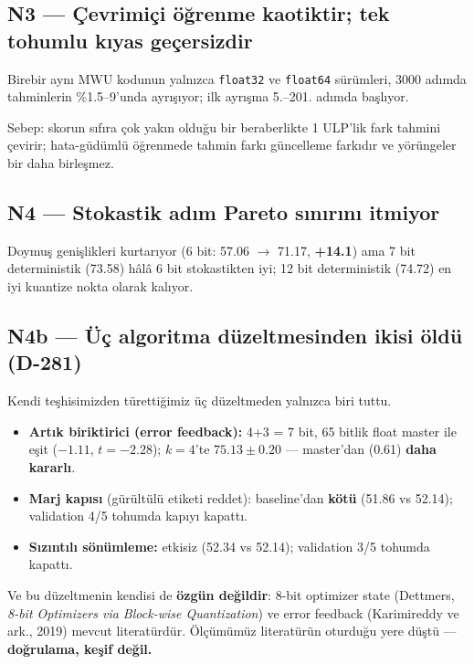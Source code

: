 \documentclass[11pt]{article}
\newenvironment{notkutu}{\def\FrameCommand{\fboxsep=6pt\colorbox{kutu}}\MakeFramed{\advance\hsize-\width\FrameRestore}\small}{\endMakeFramed}
\begin{document}
\subsection*{N3 — Çevrimiçi öğrenme kaotiktir; tek tohumlu kıyas geçersizdir}
Birebir aynı MWU kodunun yalnızca \texttt{float32} ve \texttt{float64} sürümleri, 3000 adımda tahminlerin \%1.5–9'unda ayrışıyor; ilk ayrışma 5.–201. adımda başlıyor.
\begin{center}\small{}\end{center}
Sebep: skorun sıfıra çok yakın olduğu bir beraberlikte 1 ULP'lik fark tahmini çevirir; hata-güdümlü öğrenmede tahmin farkı güncelleme farkıdır ve yörüngeler bir daha birleşmez.
\subsection*{N4 — Stokastik adım Pareto sınırını itmiyor}
Doymuş genişlikleri kurtarıyor (6 bit: 57.06 $\rightarrow$ 71.17, \textbf{+14.1}) ama 7 bit deterministik (73.58) hâlâ 6 bit stokastikten iyi; 12 bit deterministik (74.72) en iyi kuantize nokta olarak kalıyor.
\subsection*{N4b — Üç algoritma düzeltmesinden ikisi öldü (D-281)}
Kendi teşhisimizden türettiğimiz üç düzeltmeden yalnızca biri tuttu.
\begin{itemize}\item  \textbf{Artık biriktirici (error feedback):} 4+3 = 7 bit, 65 bitlik float master ile eşit ($-1.11$, $t{=}-2.28$); $k{=}4$'te $75.13\pm0.20$ — master'dan (0.61) \textbf{daha kararlı}.
\item  \textbf{Marj kapısı} (gürültülü etiketi reddet): baseline'dan \textbf{kötü} (51.86 vs 52.14); validation 4/5 tohumda kapıyı kapattı.
\item  \textbf{Sızıntılı sönümleme:} etkisiz (52.34 vs 52.14); validation 3/5 tohumda kapattı.
\end{itemize}
\begin{notkutu} Ve bu düzeltmenin kendisi de \textbf{özgün değildir}: 8-bit optimizer state (Dettmers, \emph{8-bit Optimizers via Block-wise Quantization}) ve error feedback (Karimireddy ve ark., 2019) mevcut literatürdür. Ölçümümüz literatürün oturduğu yere düştü — \textbf{doğrulama, keşif değil.}
\end{notkutu}
\end{document}
